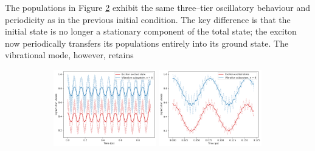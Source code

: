 \documentclass[11pt]{article}
\begin{document}
The populations in Figure \ref{fig:EVM_CQS_Pop_eg} exhibit the same three--tier oscillatory behaviour and periodicity as in the previous initial condition. The key difference is that the initial state is no longer a stationary component of the total state; the exciton now periodically transfers its populations entirely into its ground state. The vibrational mode, however, retains
\begin{figure}[H]
    \centering

    \begin{subfigure}{\textwidth}
        \centering
        \includegraphics[width=0.49\textwidth]{Research Project/Code/results/ExVib/Closed/Envelope/pops_excited_eg.png}
        \hfill
        \includegraphics[width=0.49\textwidth]{Research Project/Code/results/ExVib/Closed/Fast/pops_excited_eg.png}
        \caption{}
        \label{fig:EVM_CQS_Pop_eg}
    \end{subfigure}

    \vspace{0.8em}


\end{figure}
\end{document}
